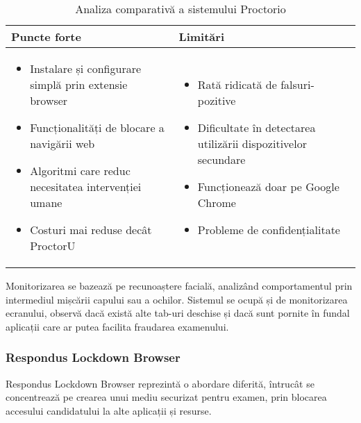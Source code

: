 \documentclass[12pt,a4paper]{article}
\begin{document}
\begin{table}[h]
\centering
\begin{tabular}{|p{8.5cm}|p{8.5cm}|}
\hline
\textbf{Puncte forte} & \textbf{Limitări} \\
\hline
\begin{itemize}
    \item Instalare și configurare simplă prin extensie browser
    \item Funcționalități de blocare a navigării web
    \item Algoritmi care reduc necesitatea intervenției umane
    \item Costuri mai reduse decât ProctorU
\end{itemize} & 
\begin{itemize}
    \item Rată ridicată de falsuri-pozitive
    \item Dificultate în detectarea utilizării dispozitivelor secundare
    \item Funcționează doar pe Google Chrome
    \item Probleme de confidențialitate
\end{itemize} \\
\hline
\end{tabular}
\caption{Analiza comparativă a sistemului Proctorio}
\end{table}

Monitorizarea se bazează pe recunoaștere facială, analizând comportamentul prin 
intermediul mișcării capului sau a ochilor. Sistemul se ocupă și de monitorizarea 
ecranului, observă dacă există alte tab-uri deschise și dacă sunt pornite în fundal 
aplicații care ar putea facilita fraudarea examenului.

\subsubsection{Respondus Lockdown Browser}
\hspace{6mm}Respondus Lockdown Browser reprezintă o abordare diferită, 
întrucât se concentrează pe crearea unui mediu securizat pentru examen,
prin blocarea accesului candidatului la alte aplicații și resurse.
\end{document}
